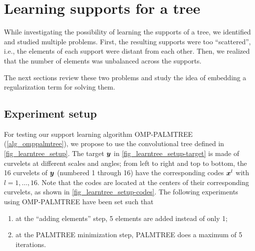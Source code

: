 
\FloatBarrier
\section{Learning supports for a tree}

While investigating the possibility of learning the supports of a tree, we identified and studied multiple problems. First, the resulting supports were too “scattered”, i.e., the elements of each support were distant from each other. Then, we realized that the number of elements was unbalanced across the supports.

\noindent
The next sections review these two problems and study the idea of embedding a regularization term for solving them.


\subsection{Experiment setup}

For testing our support learning algorithm OMP-PALMTREE (\cref{alg_omppalmtree}), we propose to use the convolutional tree defined in \cref{fig_learntree_setup}. The target $\bm{y}$ in \cref{fig_learntree_setup-target} is made of curvelets at different scales and angles; from left to right and top to bottom, the 16 curvelets of $\bm{y}$ (numbered 1 through 16) have the corresponding codes $\bm{x}^l$ with $l=1,\dots,16$. Note that the codes are located at the centers of their corresponding curvelets, as shown in \cref{fig_learntree_setup-codes}.
The following experiments using OMP-PALMTREE have been set such that
\begin{enumerate}[label=(\roman*),noitemsep,nolistsep]
	\item at the “adding elements” step, 5 elements are added instead of only 1;
	\item at the PALMTREE minimization step, PALMTREE does a maximum of 5 iterations.
\end{enumerate}

